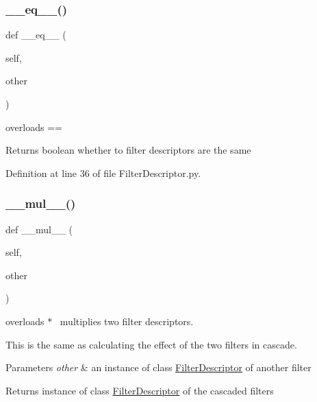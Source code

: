 \subsubsection{\texorpdfstring{\+\_\+\+\_\+eq\+\_\+\+\_\+()}{\_\_eq\_\_()}}
{\footnotesize\ttfamily def \+\_\+\+\_\+eq\+\_\+\+\_\+ (\begin{DoxyParamCaption}\item[{}]{self,  }\item[{}]{other }\end{DoxyParamCaption})}



overloads == 

\begin{DoxyReturn}{Returns}
boolean whether to filter descriptors are the same 
\end{DoxyReturn}


Definition at line 36 of file Filter\+Descriptor.\+py.

\mbox{\label{classSignalIntegrity_1_1TimeDomain_1_1Filters_1_1FilterDescriptor_1_1FilterDescriptor_a96fd98a8997501189d60829abc0257cb}} 
\subsubsection{\texorpdfstring{\+\_\+\+\_\+mul\+\_\+\+\_\+()}{\_\_mul\_\_()}}
{\footnotesize\ttfamily def \+\_\+\+\_\+mul\+\_\+\+\_\+ (\begin{DoxyParamCaption}\item[{}]{self,  }\item[{}]{other }\end{DoxyParamCaption})}



overloads $\ast$~\newline
 multiplies two filter descriptors. 

This is the same as calculating the effect of the two filters in cascade. 
\begin{DoxyParams}{Parameters}
{\em other} & an instance of class \hyperlink{classSignalIntegrity_1_1TimeDomain_1_1Filters_1_1FilterDescriptor_1_1FilterDescriptor}{Filter\+Descriptor} of another filter \\
\hline
\end{DoxyParams}
\begin{DoxyReturn}{Returns}
instance of class \hyperlink{classSignalIntegrity_1_1TimeDomain_1_1Filters_1_1FilterDescriptor_1_1FilterDescriptor}{Filter\+Descriptor} of the cascaded filters 
\end{DoxyReturn}


